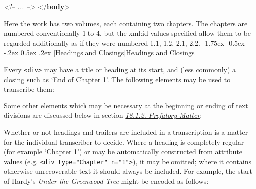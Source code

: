 \documentclass[11pt,twoside]{article}\makeatletter
\makeatletter
\renewcommand\section{\@startsection {section}{1}{\z@}%
     {-1.75ex \@plus -0.5ex \@minus -.2ex}%
     {0.5ex \@plus .2ex}%
     {\reset@font\Large\bfseries\sffamily}}
\renewcommand\subsection{\@startsection{subsection}{2}{\z@}%
     {-1.75ex\@plus -0.5ex \@minus- .2ex}%
     {0.5ex \@plus .2ex}%
     {\reset@font\Large\sffamily}}
\def\DivII{\subsection}
\def\DivII{\section}
\makeatother
\begin{document}
\begin{shaded}
\hspace*{1em}\mbox{}\newline 
\hspace*{1em}\mbox{}\newline 
\textit{<!-- ... -->}\mbox{}\newline 
\hspace*{1em}\mbox{}\newline 
{}\mbox{}\newline 
{</\textbf{body}>}\end{shaded}\egroup\par \noindent 
Here the work has two volumes, each containing two chapters.
The chapters are numbered conventionally 1 to 4, but the xml:id
values specified allow them to be regarded additionally as if they
were numbered 1.1, 1.2, 2.1, 2.2.
\DivII[Headings and Closings]{Headings and Closings}\label{h25}\par Every \texttt{<div>}  may
have a title or heading at its start, and (less commonly) a closing
such as ‘End of Chapter 1’.  The
following elements may be used to transcribe them:



Some other elements which may be necessary at the beginning or ending
of text divisions are discussed below in section \textit{\hyperref[h52]{18.1.2. Prefatory Matter}}.\par Whether or not headings and trailers are included in a
transcription is a matter for the individual transcriber to decide.
Where a heading is completely regular (for example ‘Chapter 1’)
or may be automatically constructed from attribute values
(e.g. \texttt{<div type="Chapter" n="1">}), it may be omitted; where it
contains otherwise unrecoverable text it should always be included.
For example, the start of Hardy's \textit{Under the Greenwood
Tree} might be encoded as follows:
\end{document}
